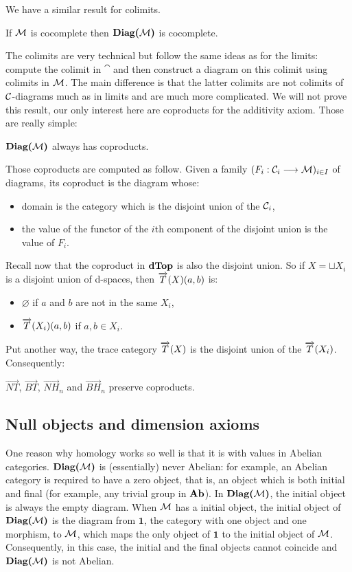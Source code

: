 We have a similar result for colimits.
\begin{prop}
If $\mathcal{M}$ is cocomplete then $\textbf{Diag(}\mathcal{M}\textbf{)}$ is cocomplete.
\end{prop}

The colimits are very technical but follow the same ideas as for the limits: compute the colimit in $\cat$ and then construct a diagram on this colimit using colimits in $\mathcal{M}$. The main difference is that the latter colimits are not colimits of $\mathcal{C}$-diagrams much as in limits and are much more complicated. We will not prove this result, our only interest here are coproducts for the additivity axiom. Those are really simple:

\begin{prop}
$\textbf{Diag(}\mathcal{M}\textbf{)}$ always has coproducts.
\end{prop}

Those coproducts are computed as follow. Given a family $(F_i : \mathcal{C}_i \longrightarrow \mathcal{M})_{i\in I}$ of diagrams, its coproduct is the diagram whose:
\begin{itemize}
	\item domain is the category which is the disjoint union of the $\mathcal{C}_i$,
	\item the value of the functor of the $i$th component of the disjoint union is the value of $F_i$.
\end{itemize}

Recall now that the coproduct in $\textbf{dTop}$ is also the disjoint union. So if $X = \sqcup X_i$ is a disjoint union of d-spaces, then $\overrightarrow{T}(X)(a,b)$ is:
\begin{itemize}
	\item $\varnothing$ if $a$ and $b$ are not in the same $X_i$,
	\item $\overrightarrow{T}(X_i)(a,b)$ if $a, b \in X_i$.
\end{itemize}
Put another way, the trace category $\overrightarrow{T}(X)$ is the disjoint union of the $\overrightarrow{T}(X_i)$. Consequently:

\begin{prop}
$\overrightarrow{NT}$, $\overrightarrow{BT}$, $\overrightarrow{NH}_n$ and $\overrightarrow{BH}_n$ preserve coproducts.
\end{prop}
	
	\subsection{Null objects and dimension axioms}
	
	One reason why homology works so well is that it is with values in Abelian categories. $\textbf{Diag(}\mathcal{M}\textbf{)}$ is (essentially) never Abelian: for example, an Abelian category is required to have a zero object, that is, an object which is both initial and final (for example, any trivial group in $\textbf{Ab}$). In $\textbf{Diag(}\mathcal{M}\textbf{)}$, the initial object is always the empty diagram. When $\mathcal{M}$ has a initial object, the initial object of $\textbf{Diag(}\mathcal{M}\textbf{)}$ is the diagram from $\textbf{1}$, the category with one object and one morphism, to $\mathcal{M}$, which maps the only object of $\textbf{1}$ to the initial object of $\mathcal{M}$. Consequently, in this case, the initial and the final objects cannot coincide and $\textbf{Diag(}\mathcal{M}\textbf{)}$ is not Abelian.
	
